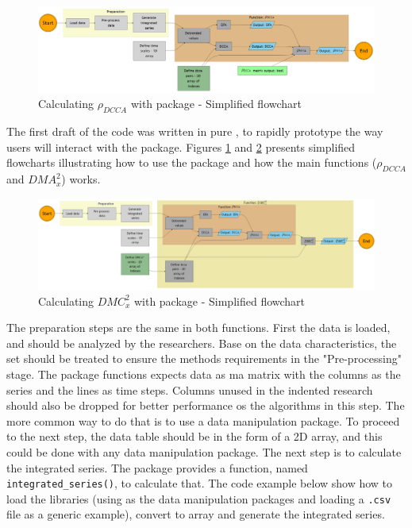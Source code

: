 \documentclass[article]{jss}
\begin{document}
\begin{figure}[h!]
  \centering
  \includegraphics{./figs/pdcca_chart.png}
  \caption{\label{fig:pdcca_chart}Calculating  $\rho_{DCCA}$ with  package - Simplified flowchart}
\end{figure}

The first draft of the code was written in pure , to rapidly prototype the way users will interact with the package. Figures \ref{fig:pdcca_chart} and \ref{fig:dmc_chart} presents simplified flowcharts illustrating how to use the package and how the main functions ($\rho_{DCCA}$ and $DMA_x^2$) works.

\begin{figure}[h!]
  \centering
  \includegraphics{./figs/dmc_chart.png}
  \caption{\label{fig:dmc_chart}Calculating  $DMC_x^2$ with  package - Simplified flowchart}
\end{figure}

The preparation steps are the same in both functions. First the data is loaded, and should be analyzed by the researchers. Base on the data characteristics, the set should be treated to ensure the methods requirements in the "Pre-processing" stage. The package functions expects data as ma matrix with the columns as the series and the lines as time steps. Columns unused in the indented research should also be dropped for better performance os the algorithms in this step. The more common way to do that is to use a data manipulation package. To proceed to the next step, the data table should be in the form of a  2D array, and this could be done with any data manipulation  package. The next step is to calculate the integrated series. The package provides a function, named \verb"integrated_series()", to calculate that. The code example below show how to load the libraries (using  as the data manipulation packages and loading a \verb".csv" file as a generic example), convert to  array and generate the integrated series.
\end{document}
